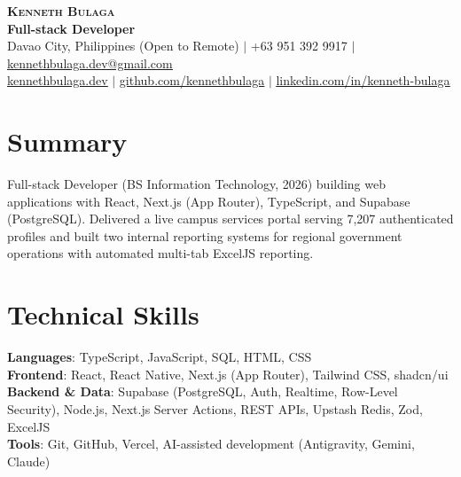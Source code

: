 \documentclass[a4paper,10pt]{article}
\begin{document}
\begin{center}
    \textbf{\Huge \scshape Kenneth Bulaga} \\ \vspace{2pt}
    \textbf{\large Full-stack Developer} \\ \vspace{2pt}
    \small Davao City, Philippines (Open to Remote) $|$ +63 951 392 9917 $|$ \href{mailto:kennethbulaga.dev@gmail.com}{\underline{kennethbulaga.dev@gmail.com}} \\ \vspace{1pt}
    \href{https://kennethbulaga.dev}{\underline{kennethbulaga.dev}} $|$
    \href{https://github.com/kennethbulaga}{\underline{github.com/kennethbulaga}} $|$
    \href{https://www.linkedin.com/in/kenneth-bulaga}{\underline{linkedin.com/in/kenneth-bulaga}}
\end{center}

\section{Summary}
\small{Full-stack Developer (BS Information Technology, 2026) building web applications with React, Next.js (App Router), TypeScript, and Supabase (PostgreSQL). Delivered a live campus services portal serving 7,207 authenticated profiles and built two internal reporting systems for regional government operations with automated multi-tab ExcelJS reporting.}

\section{Technical Skills}
 \begin{itemize}[leftmargin=0.15in, label={}]
    \small{\item{
     \textbf{Languages}{: TypeScript, JavaScript, SQL, HTML, CSS} \\
     \textbf{Frontend}{: React, React Native, Next.js (App Router), Tailwind CSS, shad{}cn/ui} \\
     \textbf{Backend \& Data}{: Supabase (PostgreSQL, Auth, Realtime, Row-Level Security), Node.js, Next.js Server Actions, REST APIs, Upstash Redis, Zod, ExcelJS} \\
     \textbf{Tools}{: Git, GitHub, Vercel, AI-assisted development (Antigravity, Gemini, Claude)}
    }}
 \end{itemize}
\end{document}
